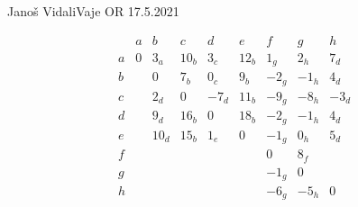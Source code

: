 \begin{naloga}{Janoš Vidali}{Vaje OR 17.5.2021}
\begin{odgovor}

\begin{tabela}
$$
\begin{array}{c|cccccccc}
& a & b & c & d & e & f & g & h \\ \hline
a & 0 & 3_a & 10_b & 3_c & 12_b &  1_g &  2_h &  7_d \\
b & & 0 & 7_b & 0_c & 9_b & -2_g & -1_h &  4_d \\
c & & 2_d & 0 & -7_d & 11_b & -9_g & -8_h & -3_d \\
d & & 9_d & 16_b & 0 & 18_b & -2_g & -1_h & 4_d \\
e & & 10_d & 15_b & 1_e & 0 & -1_g &  0_h & 5_d \\
f & & & & & & 0 & 8_f & \\
g & & & & & & -1_g & 0 & \\
h & & & & & & -6_g & -5_h & 0 \\
\end{array}
$$
\end{tabela}

\end{odgovor}
\end{naloga}

